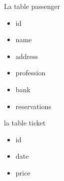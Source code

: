 \documentclass{article}
\begin{document}
        La table passenger 
            \begin{itemize}
                \centering
                \item id 
                \item name
                \item address
                \item profession
                \item bank 
                \item reservations
            \end{itemize}
        la table ticket 
            \begin{itemize}
                \centering
                \item id 
                \item date
                \item price
            \end{itemize}
            
\end{document}
